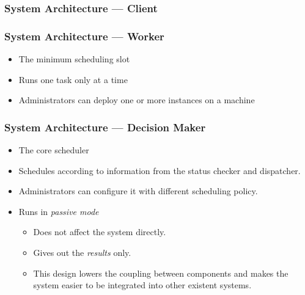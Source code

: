 \begin{frame}
  \frametitle{System Architecture --- Client}
\end{frame}
\begin{frame}
  \frametitle{System Architecture --- Worker}
  \begin{itemize}
    \item The minimum scheduling slot
    \item Runs one task only at a time
    \item Administrators can deploy one or more instances on a machine
  \end{itemize}
\end{frame}
\begin{frame}
  \frametitle{System Architecture --- Decision Maker}
  \begin{itemize}
    \item The core scheduler
    \item Schedules according to information from the status checker and
      dispatcher.
    \item Administrators can configure it with different scheduling
      policy.
    \item Runs in \emph{passive mode}
      \begin{itemize}
        \item Does not affect the system directly.
        \item Gives out the \emph{results} only.
        \item This design lowers the coupling between components and
          makes the system easier to be integrated into other existent
          systems.
      \end{itemize}
  \end{itemize}
\end{frame}
